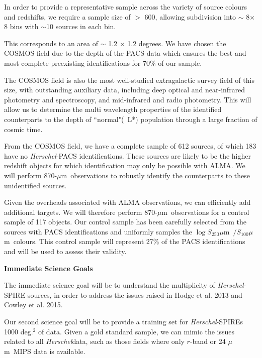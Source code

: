 \documentclass[12pt,a4paper]{article}
\newcommand{\herschel}{{\it Herschel}}
\newcommand{\micron}{$\mu$m}
\begin{document}
In order to provide a representative sample across the variety of source colours and redshifts, we require a sample size of $>$ 600, allowing subdivision into $\sim$ 8$\times$8 bins with $\sim$10 sources in each bin.

This corresponds to an area of $\sim$ 1.2 $\times$ 1.2 degrees. We have chosen the COSMOS field due to the depth of the PACS data which ensures the best and most complete preexisting identifications for 70\% of our sample.

The COSMOS field is also the most well-studied extragalactic survey field of this size, with outstanding auxiliary data, including deep optical and
near-infrared photometry and spectroscopy, and mid-infrared and radio
photometry. This will allow us to determine the multi wavelength properties of the identified counterparts to the depth of ``normal"(~L*) population through a large fraction of cosmic time. 

From the COSMOS field, we have a complete sample of 612 sources, of which 183 have no \herschel-PACS identifications. These sources are likely to be the higher redshift objects for which identification may only be possible with ALMA. We will perform 870-\micron\ observations to robustly identify the counterparts to these unidentified sources.

Given the overheads associated with ALMA observations, we can efficiently add additional targets. We will therefore perform 870-\micron\ observations for a control sample of 117 objects. 
Our control sample has been carefully selected from the sources with PACS identifications and uniformly samples the $\log S_{250}$\micron\ $/S_{100}$\micron\ colours. This control sample will represent 27\% of the PACS identifications and will be used to assess their validity. 
%
%

{\bf Immediate Science Goals}

The immediate science goal will be to understand the multiplicity of \herschel-SPIRE sources, in order to address the issues raised in Hodge et al. 2013 and Cowley et al. 2015.

Our second science goal will be to provide a training set for \herschel-SPIREs 1000 deg.$^2$ of data. Given a gold standard sample, we can mimic the issues related to all \herschel data, such as those fields where only $r$-band or 24 \micron\ MIPS data is available.
\end{document}
